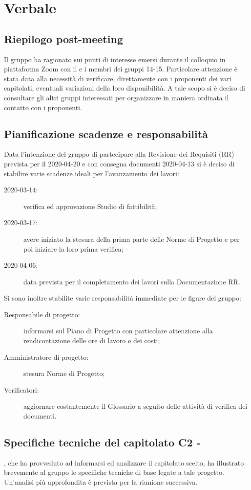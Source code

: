 \section{Verbale}
\subsection{Riepilogo post-meeting}
Il gruppo ha ragionato sui punti di interesse emersi durante il colloquio in piattaforma Zoom con il \TV{} e i membri dei gruppi 14-15. Particolare attenzione è stata data alla necessità di verificare, direttamente con i proponenti dei vari capitolati, eventuali variazioni della loro disponibilità. A tale scopo si è deciso di consultare gli altri gruppi interessati per organizzare in maniera ordinata il contatto con i proponenti.

\subsection{Pianificazione scadenze e responsabilità}
Data l'intenzione del gruppo di partecipare alla Revisione dei Requisiti (RR) prevista per il 2020-04-20 e con consegna documenti 2020-04-13 si è deciso di stabilire varie scadenze ideali per l'avanzamento dei lavori:
\begin{description}
	\item[2020-03-14:] verifica ed approvazione Studio di fattibilità;
	\item[2020-03-17:] avere iniziato la stesura della prima parte delle Norme di Progetto e per poi iniziare la loro prima verifica;
	\item[2020-04-06:] data prevista per il completamento dei lavori sulla Documentazione RR.
\end{description}
Si sono inoltre stabilite varie responsabilità immediate per le figure del gruppo:
\begin{description}
	\item[Responsabile di progetto:] informarsi sul Piano di Progetto con particolare attenzione alla rendicontazione delle ore di lavoro e dei costi;
	\item[Amministratore di progetto:] stesura Norme di Progetto;
	\item[Verificatori:] aggiornare costantemente il Glossario a seguito delle attività di verifica dei documenti.
\end{description}

\subsection{Specifiche tecniche del capitolato C2 - \NomeProgetto}
\EG{}, che ha provveduto ad informarsi ed analizzare il capitolato scelto, ha illustrato brevemente al gruppo le specifiche tecniche di base legate a tale progetto. Un'analisi più approfondita è prevista per la riunione successiva.

